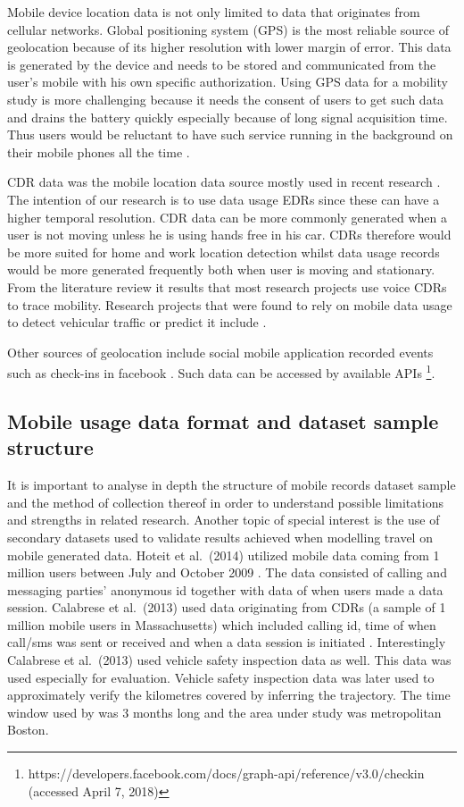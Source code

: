 \documentclass[12pt, a4paper]{report}
\theoremstyle{definition}
\theoremstyle{definition}%
\theoremstyle{definition}%
\theoremstyle{definition}%
\theoremstyle{definition}%
\theoremstyle{definition}%
\begin{document}
Mobile device location data is not only limited to data that originates from cellular networks. Global positioning system (GPS) is the most reliable source of geolocation because of its higher resolution with lower margin of error. This data is generated by the device and needs to be stored and communicated from the user's mobile with his own specific authorization. Using GPS data for a mobility study is more challenging because it needs the consent of users to get such data and drains the battery quickly especially because of long signal acquisition time\cite{Wang2012}. Thus users would be reluctant to have such service running in the background on their mobile phones all the time \cite{Ahas2011}. 

CDR data was the mobile location data source mostly used in recent research \cite{Hoteit2016}. The intention of our research is to use data usage EDRs since these can have a higher temporal resolution. CDR data can be more commonly generated when a user is not moving unless he is using hands free in his car. CDRs therefore would be more suited for home and work location detection whilst data usage records would be more generated frequently both when user is moving and stationary. From the literature review it results that most research projects use voice CDRs to trace mobility. Research projects that were found to rely on mobile data usage to detect vehicular traffic or predict it include \cite{Hoteit2014,Calabrese2011}.

Other sources of geolocation include social mobile application recorded events such as check-ins in facebook \cite{Hoteit2014}. Such data can be accessed by available APIs \footnote{https://developers.facebook.com/docs/graph-api/reference/v3.0/checkin (accessed April 7, 2018)}.

\subsection{Mobile usage data format and dataset sample structure} \label{methodoloy_sources}


It is important to analyse in depth the structure of mobile records dataset sample and the method of collection thereof in order to understand possible limitations and strengths in related research. Another topic of special interest is the use of secondary datasets used to validate results achieved when modelling travel on mobile generated data. Hoteit et al.\ (2014) utilized mobile data coming from 1 million users between July and October 2009 \cite{Hoteit2014}. The data consisted of calling and messaging parties' anonymous id together with data of when users made a data session. Calabrese et al.\ (2013) used data originating from CDRs (a sample of 1 million mobile users in Massachusetts) which included calling id, time of when call/sms was sent or received and when a data session is initiated \cite{Calabrese2013}. Interestingly Calabrese et al.\ (2013) used vehicle safety inspection data as well. This data was used especially for evaluation. Vehicle safety inspection data was later used to approximately verify the kilometres covered by inferring the trajectory. The time window used by \cite{Calabrese2013} was 3 months long and the  area under study was metropolitan Boston.
\end{document}
